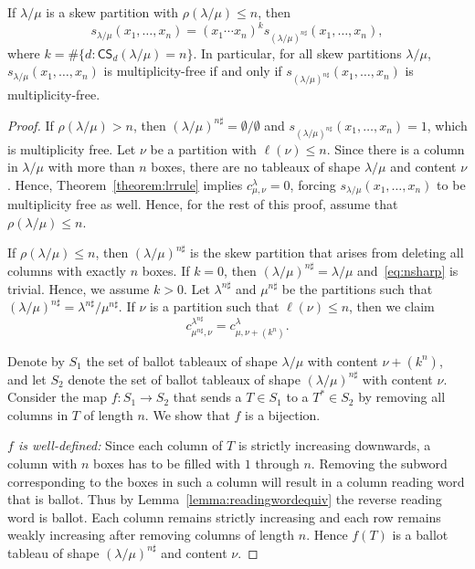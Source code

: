 \documentclass[ALCO,ThmDefs,Unicode,epreuves]{cedram}
\newcommand{\CS	}{\mathsf{CS}}
\newcommand{\nsharp}{n\sharp}%
\begin{document}
\begin{prop}
\label{prop:reductionnsharp}
If $\lambda / \mu$ is a skew partition with $\rho(\lambda/\mu)\leq n$, then 
\begin{equation}
\label{eq:nsharp}
s_{\lambda / \mu}(x_1,\ldots,x_n) = (x_1 \cdots x_n)^k s_{(\lambda / \mu)^{\nsharp}}(x_1,\ldots,x_n),
\end{equation}
where $k = \# \{ d : \CS _d(\lambda / \mu) = n \}$. In particular, for all skew partitions $\lambda/\mu$, $s_{\lambda / \mu}(x_1,\ldots,x_n)$ is multiplicity-free if and only if $s_{(\lambda / \mu)^{\nsharp }}(x_1,\ldots,x_n)$ is multiplicity-free.
\end{prop}
\begin{proof}
If $\rho(\lambda / \mu) > n$, then $(\lambda / \mu)^{\nsharp } = \emptyset / \emptyset$ and $s_{(\lambda / \mu)^{\nsharp }}(x_1,\ldots,x_n) = 1$, which is multiplicity free. Let $\nu$ be a partition with $\ell(\nu) \leq n$. Since there is a column in $\lambda / \mu$ with more than $n$ boxes, there are no tableaux of shape $\lambda / \mu$ and content $\nu$. Hence, Theorem~\ref{theorem:lrrule} implies $c_{\mu, \nu}^{\lambda} = 0$, forcing $s_{\lambda / \mu}(x_1,\ldots,x_n)$ to be multiplicity free as well. Hence, for the rest of this proof, assume that $\rho(\lambda/\mu)\leq n$.

If $\rho(\lambda / \mu) \leq n$, then $(\lambda / \mu)^{\nsharp }$ is the skew partition that arises from deleting all columns with exactly $n$ boxes. If $k = 0$, then $(\lambda / \mu)^{\nsharp }=\lambda / \mu$ and~\eqref{eq:nsharp} is trivial. Hence, we assume $k > 0$. Let $\lambda^{n\sharp}$ and $\mu^{n\sharp}$ be the partitions such that $(\lambda / \mu)^{\nsharp } = \lambda^{n\sharp} / \mu^{n\sharp}$. If $\nu$ is a partition such that $\ell(\nu) \leq n$, then we claim
\begin{equation}
\label{eq:nsharpLR}
c_{\mu^{n\sharp}, \nu}^{\lambda^{n\sharp}} = c_{\mu, \nu + (k^n)}^{\lambda}.
\end{equation}

Denote by $S_1$ the set of ballot tableaux of shape $\lambda/\mu$ with content $\nu + (k^n)$, and let $S_2$ denote the set of ballot tableaux of shape $(\lambda / \mu)^{\nsharp }$ with content $\nu$. Consider the map $f:S_1\xrightarrow{}S_2$ that sends a $T \in S_1$ to a $T^* \in S_2$ by removing all columns in $T$ of length $n$. We show that $f$ is a bijection.

\emph{$f$ is well-defined:} Since each column of $T$ is strictly increasing downwards, a column with $n$ boxes has to be filled with $1$ through $n$. Removing the subword corresponding to the boxes in such a column will result in a column reading word that is ballot. Thus by Lemma~\ref{lemma:readingwordequiv} the reverse reading word is ballot. Each column remains strictly increasing and each row remains weakly increasing after removing columns of length $n$. Hence $f(T)$ is a ballot tableau of shape $(\lambda / \mu)^{\nsharp }$ and content $\nu$.


\end{proof}
\end{document}
